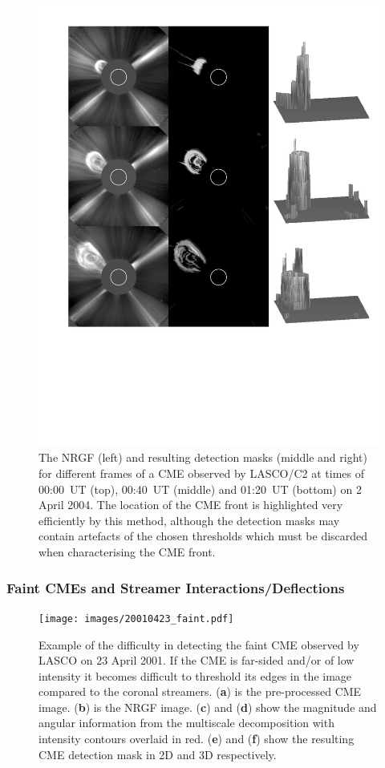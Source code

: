 \documentclass[namedreferences]{SolarPhysics}
\begin{document}
\begin{article}
\begin{figure}[p]
\centerline{\includegraphics[scale=0.75, clip=true, trim=40 200 0 0]{images/20040401_cme_masks.pdf}}
\caption{The NRGF (left) and resulting detection masks (middle and right) for different frames of a CME observed by LASCO/C2 at times of 00:00~UT (top), 00:40~UT (middle) and 01:20~UT (bottom) on 2 April 2004. The location of the CME front is highlighted very efficiently by this method, although the detection masks may contain artefacts of the chosen thresholds which must be discarded when characterising the CME front.}
\label{20040401_cme_masks}
\end{figure}

\subsubsection{Faint CMEs and Streamer Interactions/Deflections}

\begin{figure}[!p]
\centerline{\texttt{[image: images/20010423\_faint.pdf]}}
\caption{Example of the difficulty in detecting the faint CME observed by LASCO on 23 April 2001. If the CME is far-sided and/or of low intensity it becomes difficult to threshold its edges in the image compared to the coronal streamers. ({\bf a}) is the pre-processed CME image. ({\bf b}) is the NRGF image. ({\bf c}) and ({\bf d}) show the magnitude and angular information from the multiscale decomposition with intensity contours overlaid in red. ({\bf e}) and ({\bf f}) show the resulting CME detection mask in 2D and 3D respectively.}
\label{faintCME}
\end{figure}


\end{article}
\end{document}
